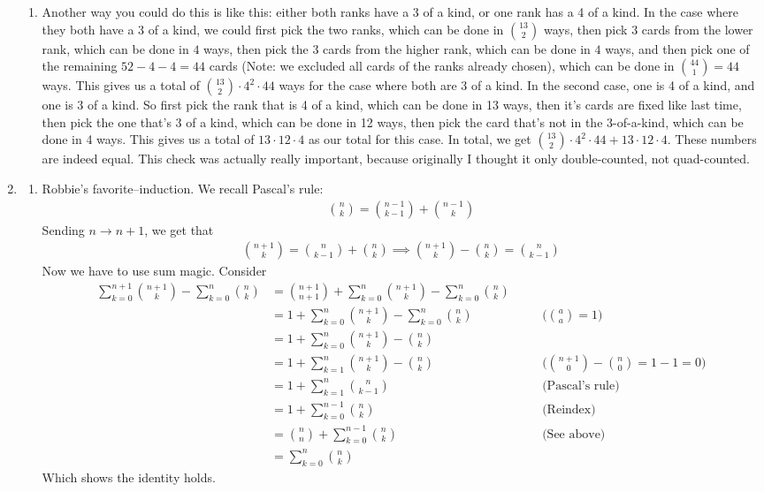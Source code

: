 \documentclass[12pt]{article}
\theoremstyle{definition}
\theoremstyle{remark}
\newcommand{\justif}[1]{&\quad &\text{(#1)}}
\begin{document}
\begin{enumerate}[leftmargin=\labelsep]
\begin{enumerate}
			\item Another way you could do this is like this: either both ranks have a 3 of a kind, or one rank has a 4 of a kind. In the case where they both have a 3 of a kind, we could first pick the two ranks, which can be done in ${13 \choose 2}$ ways, then pick 3 cards from the lower rank, which can be done in $4$ ways, then pick the 3 cards from the higher rank, which can be done in $4$ ways, and then pick one of the remaining $52 - 4 - 4 = 44$ cards (Note: we excluded all cards of the ranks already chosen), which can be done in ${44 \choose 1} = 44$ ways. This gives us a total of ${13 \choose 2} \cdot 4^2 \cdot 44$ ways for the case where both are 3 of a kind. In the second case, one is 4 of a kind, and one is 3 of a kind. So first pick the rank that is 4 of a kind, which can be done in 13 ways, then it's cards are fixed like last time, then pick the one that's 3 of a kind, which can be done in 12 ways, then pick the card that's not in the 3-of-a-kind, which can be done in 4 ways. This gives us a total of $13 \cdot 12 \cdot 4$ as our total for this case. In total, we get ${13 \choose 2} \cdot 4^2 \cdot 44 + 13 \cdot 12 \cdot 4$. These numbers are indeed equal. This check was actually really important, because originally I thought it only double-counted, not quad-counted.
		\end{enumerate}
		
		\newpage
		\item
		\begin{enumerate}
			\item Robbie's favorite--induction. We recall Pascal's rule: 
			\begin{align*}
				{n \choose k} = {n-1 \choose k-1} + {n-1 \choose k}
			\end{align*}
			Sending $n \to n+1$, we get that
			\begin{align*}
				{n+1 \choose k} = {n \choose k-1} + {n \choose k} \implies {n+1 \choose k} - {n \choose k} = {n \choose k-1}
			\end{align*}
			Now we have to use sum magic. Consider
			\begin{align*}
				\sum_{k=0}^{n+1} {n+1 \choose k} - \sum_{k=0}^n {n \choose k} &= {n+1 \choose n+1} + \sum_{k=0}^{n} {n+1 \choose k} - \sum_{k=0}^n {n \choose k} \\
				&= 1 + \sum_{k=0}^{n} {n+1 \choose k} - \sum_{k=0}^n {n \choose k} \justif{${a \choose a} = 1$}  \\
				&= 1 + \sum_{k=0}^n {n+1 \choose k} - {n \choose k} \\
				&= 1 + \sum_{k=1}^n {n+1 \choose k} - {n \choose k} \justif{${n+1 \choose 0} - {n \choose 0} = 1 - 1 = 0$} \\
				&= 1 + \sum_{k=1}^n {n \choose k-1} \justif{Pascal's rule} \\
				&= 1 + \sum_{k=0}^{n-1} {n \choose k} \justif{Reindex} \\
				&= {n \choose n} + \sum_{k=0}^{n-1} {n \choose k} \justif{See above} \\
				&= \sum_{k=0}^n {n \choose k}
			\end{align*}
			Which shows the identity holds. 
			

\end{enumerate}
\end{enumerate}
\end{document}
